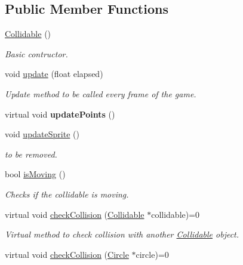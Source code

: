 \subsection*{Public Member Functions}
\begin{DoxyCompactItemize}
\item 
\hyperlink{class_collidable_a92ce9e2b08086bb2f466168ffc69c9ed}{Collidable} ()
\begin{DoxyCompactList}\small\item\em Basic contructor. \end{DoxyCompactList}\item 
void \hyperlink{class_collidable_ad636cf1a7fab85fb2dfedf08c02c7745}{update} (float elapsed)
\begin{DoxyCompactList}\small\item\em Update method to be called every frame of the game. \end{DoxyCompactList}\item 
\hypertarget{class_collidable_abeb14a34d7c7dc47b0c3c51a25a44e64}{}virtual void {\bfseries update\+Points} ()\label{class_collidable_abeb14a34d7c7dc47b0c3c51a25a44e64}

\item 
void \hyperlink{class_collidable_a656ce92dd3e3f1b1981eb79c97ed3115}{update\+Sprite} ()
\begin{DoxyCompactList}\small\item\em to be removed. \end{DoxyCompactList}\item 
\hypertarget{class_collidable_a8d46b697385b10bc9447f1ac18a587a6}{}bool \hyperlink{class_collidable_a8d46b697385b10bc9447f1ac18a587a6}{is\+Moving} ()\label{class_collidable_a8d46b697385b10bc9447f1ac18a587a6}

\begin{DoxyCompactList}\small\item\em Checks if the collidable is moving. \end{DoxyCompactList}\item 
\hypertarget{class_collidable_a25c916c15277425a1b2606d35c7405fe}{}virtual void \hyperlink{class_collidable_a25c916c15277425a1b2606d35c7405fe}{check\+Collision} (\hyperlink{class_collidable}{Collidable} $\ast$collidable)=0\label{class_collidable_a25c916c15277425a1b2606d35c7405fe}

\begin{DoxyCompactList}\small\item\em Virtual method to check collision with another \hyperlink{class_collidable}{Collidable} object. \end{DoxyCompactList}\item 
\hypertarget{class_collidable_a157281cb33cb695c8eb0c8dd971b84f2}{}virtual void \hyperlink{class_collidable_a157281cb33cb695c8eb0c8dd971b84f2}{check\+Collision} (\hyperlink{class_circle}{Circle} $\ast$circle)=0\label{class_collidable_a157281cb33cb695c8eb0c8dd971b84f2}


\end{DoxyCompactItemize}
